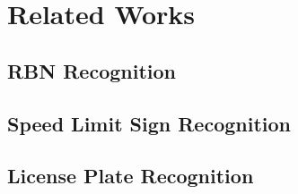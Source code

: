 \section{Related Works}
\label{sec:applications_of_image_recognition}




\subsection{RBN Recognition}

\cite{Fu:2015by}


\subsection{Speed Limit Sign Recognition}


\subsection{License Plate Recognition}

